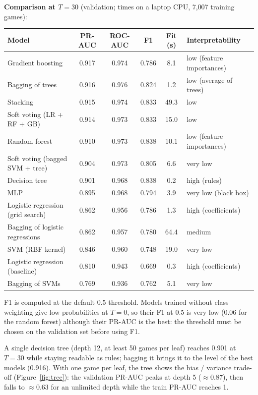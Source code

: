 \documentclass[11pt,a4paper]{article}
\begin{document}
\textbf{Comparison at $T = 30$} (validation; times on a laptop CPU, 7{,}007 training games):

\begin{center}
\small
\begin{tabular}{l c c c c l}
\toprule
Model & PR-AUC & ROC-AUC & F1 & Fit (s) & Interpretability \\
\midrule
Gradient boosting & 0.917 & 0.974 & 0.786 & 8.1 & low (feature importances) \\
Bagging of trees & 0.916 & 0.976 & 0.824 & 1.2 & low (average of trees) \\
Stacking & 0.915 & 0.974 & 0.833 & 49.3 & low \\
Soft voting (LR + RF + GB) & 0.914 & 0.973 & 0.833 & 15.0 & low \\
Random forest & 0.910 & 0.973 & 0.838 & 10.1 & low (feature importances) \\
Soft voting (bagged SVM + tree) & 0.904 & 0.973 & 0.805 & 6.6 & very low \\
Decision tree & 0.901 & 0.968 & 0.838 & 0.2 & high (rules) \\
MLP & 0.895 & 0.968 & 0.794 & 3.9 & very low (black box) \\
Logistic regression (grid search) & 0.862 & 0.956 & 0.786 & 1.3 & high (coefficients) \\
Bagging of logistic regressions & 0.862 & 0.957 & 0.780 & 64.4 & medium \\
SVM (RBF kernel) & 0.846 & 0.960 & 0.748 & 19.0 & very low \\
Logistic regression (baseline) & 0.810 & 0.943 & 0.669 & 0.3 & high (coefficients) \\
Bagging of SVMs & 0.769 & 0.936 & 0.762 & 5.1 & very low \\
\bottomrule
\end{tabular}
\end{center}

F1 is computed at the default 0.5 threshold. Models trained without class weighting give low
probabilities at $T = 0$, so their F1 at 0.5 is very low (0.06 for the random forest) although their
PR-AUC is the best: the threshold must be chosen on the validation set before using F1.

A single decision tree (depth 12, at least 50 games per leaf) reaches 0.901 at $T = 30$ while staying
readable as rules; bagging it brings it to the level of the best models (0.916). With one game per leaf,
the tree shows the bias / variance trade-off (Figure~\ref{fig:tree}): the validation PR-AUC peaks at depth 5
($\approx 0.87$), then falls to $\approx 0.63$ for an unlimited depth while the train PR-AUC reaches 1.
\end{document}
